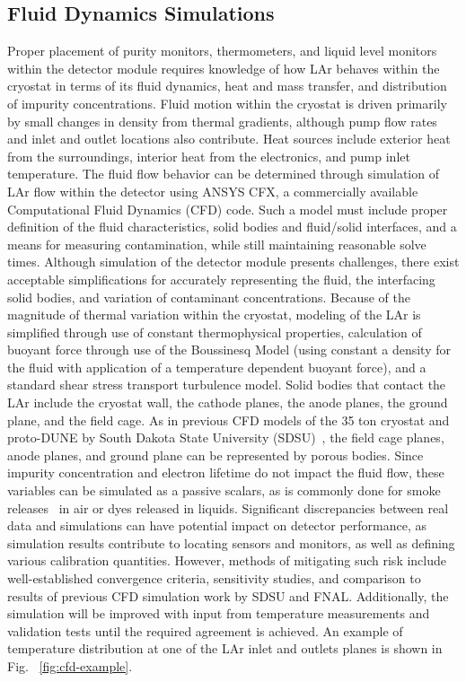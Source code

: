 \subsection{Fluid Dynamics Simulations}
\label{sec:fdgen-slow-cryo-cfd}
Proper placement of purity monitors, thermometers, and liquid level monitors within the detector module requires knowledge of how LAr behaves within the cryostat in terms of its fluid dynamics, heat and mass transfer, and distribution of impurity concentrations. 
Fluid motion within the cryostat is driven primarily by small changes in density from thermal gradients, although pump flow rates and inlet and outlet locations also contribute. 
Heat sources include exterior heat from the surroundings, interior heat from the electronics, and pump inlet temperature. 
The fluid flow behavior can be determined through simulation of LAr flow within the detector using ANSYS CFX, a commercially available Computational Fluid Dynamics (CFD) code. Such a model must include proper definition of the fluid characteristics, solid bodies and fluid/solid interfaces, and a means for measuring contamination, while still maintaining reasonable solve times.
Although simulation of the detector module presents challenges, there exist acceptable simplifications for accurately representing the fluid, the interfacing solid bodies, and variation of contaminant concentrations. Because of the magnitude of thermal variation within the cryostat, modeling of the LAr is simplified through use of constant thermophysical properties, calculation of buoyant force through use of the Boussinesq Model (using constant a density for the fluid with application of a temperature dependent buoyant force), and a standard shear stress transport turbulence model. Solid bodies that contact the LAr include the cryostat wall, the cathode planes, the anode planes, the ground plane, and the field cage. As in previous CFD models of the 35 ton cryostat and proto-DUNE by South Dakota State University (SDSU)~\cite{docdb-5915}, the field cage planes, anode planes, and ground plane can be represented by porous bodies. Since impurity concentration and electron lifetime do not impact the fluid flow, these variables can be simulated as a passive scalars, as is commonly done for smoke releases~\cite{cfd-1} in air or dyes released in liquids.
Significant discrepancies between real data and simulations can have potential impact on detector performance, as simulation results contribute to locating sensors and monitors, as well as defining various calibration quantities. However, methods of mitigating such risk include well-established convergence criteria, sensitivity studies, and comparison to results of previous CFD simulation work by SDSU and FNAL. Additionally, the simulation will be improved with input from temperature measurements and validation tests until the required agreement is achieved. An example of temperature distribution at one of the LAr inlet and outlets planes is shown in Fig. ~\ref{fig:cfd-example}. 



